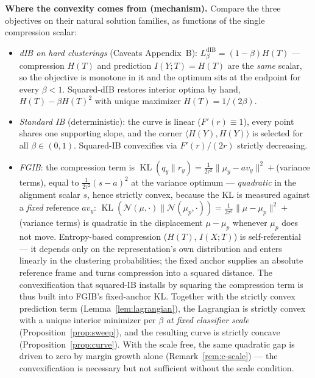 \textbf{Where the convexity comes from (mechanism).}
Compare the three objectives on their natural solution families, as functions of the
single compression scalar:
\begin{itemize}
\item \emph{dIB on hard clusterings} (Caveats Appendix~B): $L^{\mathrm{dIB}}_\beta
= (1-\beta)H(T)$ --- compression $H(T)$ and prediction $I(Y;T) = H(T)$ are the
\emph{same} scalar, so the objective is monotone in it and the optimum sits at the
endpoint for every $\beta < 1$. Squared-dIB restores interior optima by hand,
$H(T) - \beta H(T)^2$ with unique maximizer $H(T) = 1/(2\beta)$.
\item \emph{Standard IB} (deterministic): the curve is linear ($F'(r) \equiv 1$), every
point shares one supporting slope, and the corner $\langle H(Y), H(Y)\rangle$ is
selected for all $\beta \in (0,1)$. Squared-IB convexifies via $F'(r)/(2r)$ strictly
decreasing.
\item \emph{FGIB}: the compression term is $\operatorname{KL}(q_y \| r_y) =
\tfrac{1}{2\tau^2}\|\mu_y - a v_y\|^2 + {}$(variance terms), equal to
$\tfrac{1}{2\tau^2}(s-a)^2$
at the variance optimum --- \emph{quadratic} in the alignment scalar $s$, hence strictly
convex, because the KL is measured against a \emph{fixed} reference $a v_y$:
$\operatorname{KL}(\mathcal{N}(\mu,\cdot)\|\mathcal{N}(\mu_p,\cdot))
= \tfrac{1}{2\tau^2}\|\mu - \mu_p\|^2 + {}$(variance terms) is quadratic in the
displacement
$\mu - \mu_p$ whenever $\mu_p$ does not move. Entropy-based compression ($H(T)$,
$I(X;T)$) is self-referential --- it depends only on the representation's own
distribution and enters linearly in the clustering probabilities; the fixed anchor
supplies an absolute reference frame and turns compression into a squared distance. The
convexification that squared-IB installs by squaring the compression term is thus built
into FGIB's fixed-anchor KL. Together with the strictly convex prediction term
(Lemma~\ref{lem:lagrangian}), the Lagrangian is strictly convex with a unique interior
minimizer per $\beta$ \emph{at fixed classifier scale} (Proposition~\ref{prop:sweep}),
and the resulting curve is strictly concave (Proposition~\ref{prop:curve}). With the
scale free, the same quadratic gap is driven to zero by margin growth alone
(Remark~\ref{rem:c-scale}) --- the convexification is necessary but not sufficient
without the scale condition.
\end{itemize}

